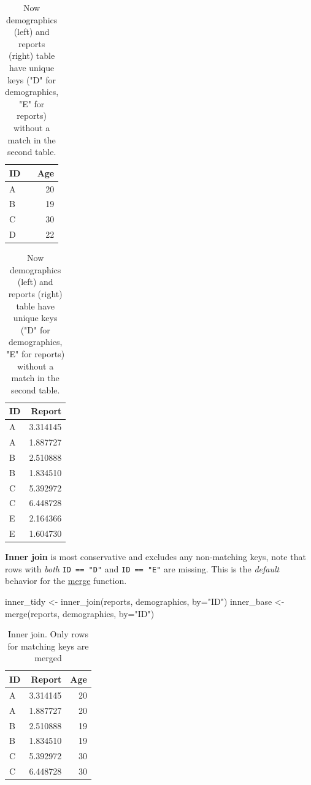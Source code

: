 \documentclass[
]{book}
\newenvironment{Shaded}{\begin{snugshade}}{\end{snugshade}}
\newcommand{\AttributeTok}[1]{\textcolor[rgb]{0.77,0.63,0.00}{#1}}
\newcommand{\FunctionTok}[1]{\textcolor[rgb]{0.00,0.00,0.00}{#1}}
\newcommand{\NormalTok}[1]{#1}
\newcommand{\OtherTok}[1]{\textcolor[rgb]{0.56,0.35,0.01}{#1}}
\newcommand{\StringTok}[1]{\textcolor[rgb]{0.31,0.60,0.02}{#1}}
\begin{document}
\begin{table}
\caption{\label{tab:unnamed-chunk-180}Now demographics (left) and reports (right) table have unique keys ("D" for demographics, "E" for reports) without a match in the second table.}

\centering
\begin{tabular}[t]{l|r}
\hline
ID & Age\\
\hline
A & 20\\
\hline
B & 19\\
\hline
C & 30\\
\hline
D & 22\\
\hline
\end{tabular}
\centering
\begin{tabular}[t]{l|r}
\hline
ID & Report\\
\hline
A & 3.314145\\
\hline
A & 1.887727\\
\hline
B & 2.510888\\
\hline
B & 1.834510\\
\hline
C & 5.392972\\
\hline
C & 6.448728\\
\hline
E & 2.164366\\
\hline
E & 1.604730\\
\hline
\end{tabular}
\end{table}

\textbf{Inner join} is most conservative and excludes any non-matching keys, note that rows with \emph{both} \texttt{ID\ ==\ "D"} and \texttt{ID\ ==\ "E"} are missing. This is the \emph{default} behavior for the \href{https://stat.ethz.ch/R-manual/R-devel/library/base/html/merge.html}{merge} function.

\begin{Shaded}
\begin{Highlighting}[]
\NormalTok{inner\_tidy }\OtherTok{\textless{}{-}} \FunctionTok{inner\_join}\NormalTok{(reports, demographics, }\AttributeTok{by=}\StringTok{"ID"}\NormalTok{) }
\NormalTok{inner\_base }\OtherTok{\textless{}{-}} \FunctionTok{merge}\NormalTok{(reports, demographics, }\AttributeTok{by=}\StringTok{"ID"}\NormalTok{)}
\end{Highlighting}
\end{Shaded}

\begin{table}

\caption{\label{tab:unnamed-chunk-182}Inner join. Only rows for matching keys are merged}
\centering
\begin{tabular}[t]{l|r|r}
\hline
ID & Report & Age\\
\hline
A & 3.314145 & 20\\
\hline
A & 1.887727 & 20\\
\hline
B & 2.510888 & 19\\
\hline
B & 1.834510 & 19\\
\hline
C & 5.392972 & 30\\
\hline
C & 6.448728 & 30\\
\hline
\end{tabular}
\end{table}
\end{document}
